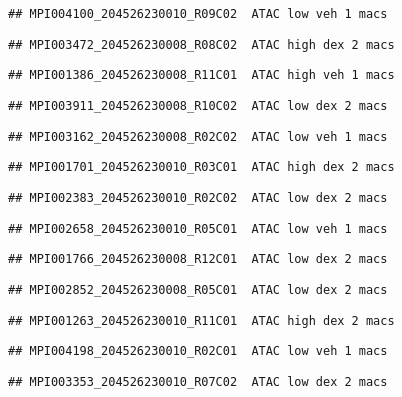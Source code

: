 \documentclass[
]{article}
\begin{document}
\begin{verbatim}
## MPI004100_204526230010_R09C02  ATAC low veh 1 macs
\end{verbatim}

\begin{verbatim}
## MPI003472_204526230008_R08C02  ATAC high dex 2 macs
\end{verbatim}

\begin{verbatim}
## MPI001386_204526230008_R11C01  ATAC high veh 1 macs
\end{verbatim}

\begin{verbatim}
## MPI003911_204526230008_R10C02  ATAC low dex 2 macs
\end{verbatim}

\begin{verbatim}
## MPI003162_204526230008_R02C02  ATAC low veh 1 macs
\end{verbatim}

\begin{verbatim}
## MPI001701_204526230010_R03C01  ATAC high dex 2 macs
\end{verbatim}

\begin{verbatim}
## MPI002383_204526230010_R02C02  ATAC low dex 2 macs
\end{verbatim}

\begin{verbatim}
## MPI002658_204526230010_R05C01  ATAC low veh 1 macs
\end{verbatim}

\begin{verbatim}
## MPI001766_204526230008_R12C01  ATAC low dex 2 macs
\end{verbatim}

\begin{verbatim}
## MPI002852_204526230008_R05C01  ATAC low dex 2 macs
\end{verbatim}

\begin{verbatim}
## MPI001263_204526230010_R11C01  ATAC high dex 2 macs
\end{verbatim}

\begin{verbatim}
## MPI004198_204526230010_R02C01  ATAC low veh 1 macs
\end{verbatim}

\begin{verbatim}
## MPI003353_204526230010_R07C02  ATAC low dex 2 macs
\end{verbatim}
\end{document}
